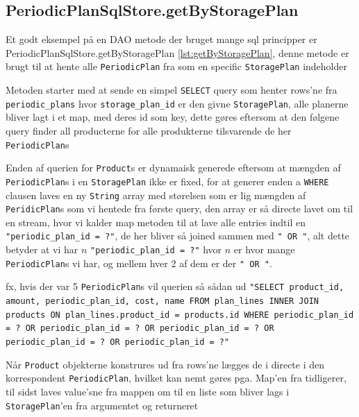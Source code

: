 \subsection{PeriodicPlanSqlStore.getByStoragePlan}
Et godt eksempel på en DAO metode der bruget mange sql principper er PeriodicPlanSqlStore.getByStoragePlan \ref{lst:getByStoragePlan}, denne metode er brugt til at hente alle \texttt{PeriodicPlan} fra som en specific \texttt{StoragePlan} indeholder

Metoden starter med at sende en simpel \texttt{SELECT} query som henter rows'ne fra \texttt{periodic\_plans} hvor \texttt{storage\_plan\_id} er den givne \texttt{StoragePlan}, alle planerne bliver lagt i et map, med deres id som key, dette gøres eftersom at den følgene query finder all producterne for alle produkterne tilsvarende de her \texttt{PeriodicPlan}s

Enden af querien for \texttt{Product}s er dynamaisk generede eftersom at mængden af \texttt{PeriodicPlan}s i en \texttt{StoragePlan} ikke er fixed, for at generer enden a \texttt{WHERE} clausen laves en ny \texttt{String} array med størelsen som er lig mængden af \texttt{PeridicPlan}s som vi hentede fra første query, den array er så directe lavet om til en stream, hvor vi kalder map metoden til at lave alle entries indtil en \texttt{"periodic\_plan\_id = ?"}, de her bliver så joined sammen med \texttt{" OR "}, alt dette betyder at vi har $n$ \texttt{"periodic\_plan\_id = ?"} hvor $n$ er hvor mange \texttt{PeriodicPlan}s vi har, og mellem hver 2 af dem er der \texttt{" OR "}.

fx, hvis der var 5 \texttt{PeriodicPlan}s vil querien så sådan ud \texttt{"SELECT product\_id, amount, periodic\_plan\_id, cost, name FROM plan\_lines INNER JOIN products ON plan\_lines.product\_id = products.id WHERE periodic\_plan\_id = ? OR periodic\_plan\_id = ? OR periodic\_plan\_id = ? OR periodic\_plan\_id = ? OR periodic\_plan\_id = ?"}

Når \texttt{Product} objekterne konstrures ud fra rows'ne lægges de i directe i den korrespondent \texttt{PeriodicPlan}, hvilket kan nemt gøres pga. Map'en fra tidligerer, til sidst laves value'sne fra mappen om til en liste som bliver lags i \texttt{StoragePlan}'en fra argumentet og returneret

